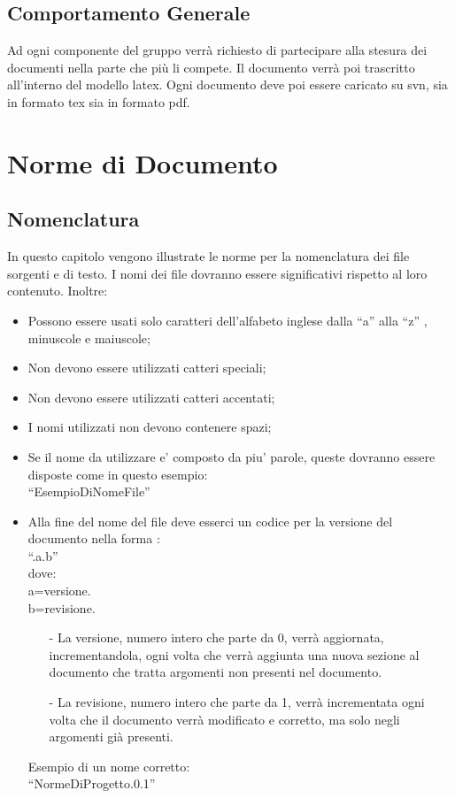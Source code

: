 \documentclass[11pt,titlepage,a4paper]{report}
\begin{document}
\section{Comportamento Generale}
Ad ogni componente del gruppo verr\`a richiesto di partecipare alla stesura dei documenti nella parte che pi\`u li compete. Il documento verr\`a poi trascritto all'interno del modello latex. Ogni documento deve poi essere caricato  su svn, sia in formato tex sia in formato pdf.

\chapter{Norme di Documento}
\section{Nomenclatura}
In questo capitolo vengono illustrate le norme per la nomenclatura dei file sorgenti e di testo. I nomi dei file dovranno essere significativi rispetto al loro contenuto. Inoltre:
\begin{itemize}
\item Possono essere usati solo caratteri dell'alfabeto inglese dalla ``a'' alla ``z'' , minuscole e maiuscole;
\item Non devono essere utilizzati catteri speciali;
\item Non devono essere utilizzati catteri accentati;
\item I nomi utilizzati non devono contenere spazi;
\item Se il nome da utilizzare e' composto da piu' parole, queste dovranno essere disposte come in questo esempio: \\
``EsempioDiNomeFile''
\item Alla fine del nome del file deve esserci un codice per la versione del documento nella forma :\\ 
``.a.b'' \\
dove:\\
a=versione.\\
b=revisione.\\
\begin{itemize}
\item[-]La versione, numero intero che parte da 0, verr\`a aggiornata, incrementandola, ogni volta che verr\`a aggiunta una nuova sezione al documento che tratta argomenti non presenti nel documento.
\item[-]La revisione, numero intero che parte da 1, verr\`a incrementata ogni volta che il documento verr\`a modificato e corretto, ma solo negli argomenti gi\`a presenti.
\end{itemize} 
Esempio di un nome corretto:\\
``NormeDiProgetto.0.1''
\end{itemize}
\end{document}
